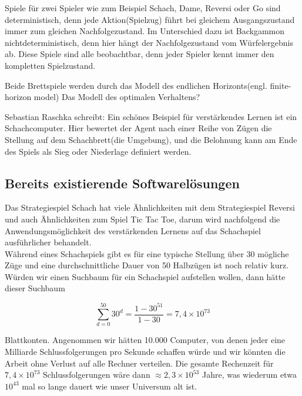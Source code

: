 Spiele für zwei Spieler wie zum Beispiel Schach, Dame, Reversi oder Go sind deterministisch, denn jede Aktion(Spielzug) führt bei gleichem Ausgangszustand immer zum gleichen Nachfolgezustand. Im Unterschied dazu ist Backgammon nichtdeterministisch, denn hier hängt der Nachfolgezustand vom Würfelergebnis ab. Diese Spiele sind alle beobachtbar, denn jeder Spieler kennt immer den kompletten Spielzustand.\cite[114]{Ertel}



Beide Brettspiele werden durch das Modell des endlichen Horizonts(engl. finite-horizon model) 
Das Modell des optimalen Verhaltens?


Sebastian Raschka schreibt: Ein schönes Beispiel für verstärkendes Lernen ist ein Schachcomputer. Hier bewertet der Agent nach einer Reihe von Zügen die Stellung auf dem Schachbrett(die Umgebung), und die Belohnung kann am Ende des Spiels als Sieg oder Niederlage definiert werden.\cite[27]{Raschka}
\subsection{Bereits existierende Softwarelösungen}

Das Strategiespiel Schach hat viele Ähnlichkeiten mit dem Strategiespiel Reversi und auch Ähnlichkeiten zum Spiel Tic Tac Toe, darum wird nachfolgend die  Anwendungsmöglichkeit des verstärkenden Lernens auf das Schachspiel ausführlicher behandelt. \\

Während eines Schachspiels gibt es für eine typische Stellung über 30 mögliche Züge und eine durchschnittliche Dauer von 50 Halbzügen ist noch relativ kurz. Würden wir einen Suchbaum  für ein Schachspiel aufstellen wollen, dann hätte dieser Suchbaum

\begin{equation}
\sum_{d=0}^{50} 30^{d} = \frac{1 - 30^{51}}{1 - 30} = 7,4 \times 10^{73}
\end{equation}

Blattkonten. Angenommen wir hätten 10.000 Computer, von denen jeder eine Milliarde Schlussfolgerungen pro Sekunde schaffen würde und wir könnten die Arbeit ohne Verlust auf alle Rechner verteilen. Die gesamte Rechenzeit für $7,4 \times 10^{73}$ Schlussfolgerungen wäre dann $\approx 2,3 \times 10^{53}$ Jahre, was wiederum etwa $10^{43}$ mal so lange dauert wie unser Universum alt ist\cite[93 \psq]{Ertel}. \\

